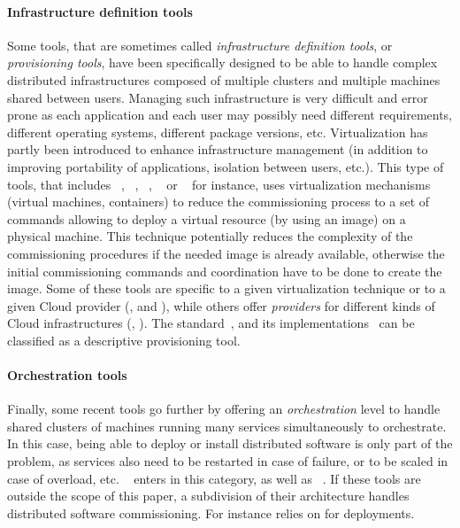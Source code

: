 \paragraph{Infrastructure definition tools}
Some tools, that are sometimes called \emph{infrastructure definition tools}, or \emph{provisioning tools}, have been specifically designed to be able to handle complex distributed infrastructures composed of multiple clusters and multiple machines shared between users. Managing such infrastructure is very difficult and error prone as each application and each user may possibly need different requirements, different operating systems, different package versions, etc. Virtualization has partly been introduced to enhance infrastructure management (in addition to improving portability of applications, isolation between users, etc.). This type of tools, that includes \docker~\cite{docker:web}, \terraform~\cite{terraform:web}, \juju~\cite{juju:web}, \cloudformation~\cite{cloudf:web} or \heat~\cite{heat:web} for instance, uses virtualization mechanisms (\eg virtual machines, containers) to reduce the commissioning process to a set of commands allowing to deploy a virtual resource (by using an image) on a physical machine. This technique potentially reduces the complexity of the commissioning procedures if the needed image is already available, otherwise the initial commissioning commands and coordination have to
be done to create the image. Some of these tools are specific to a given virtualization technique or to a given Cloud provider (\eg \docker, \cloudformation and \heat), while others offer \emph{providers} for different kinds of Cloud infrastructures (\eg \terraform, \juju). The \tosca standard~\cite{tosca:web}, and its
implementations~\cite{Binz2013,cloudify:web,opentosca:web,8599581} can be classified as a descriptive provisioning tool.

\paragraph{Orchestration tools}
Finally, some recent tools go further by offering an \emph{orchestration} level to handle shared clusters of machines running many services simultaneously to orchestrate. In this case, being able to deploy or install distributed software is only part of the problem, as services also need to be restarted in case of failure, or to be scaled in case of overload, etc. \kubernetes~\cite{kubernetes:web} enters in this category, as well as \dockerswarm~\cite{dockerswarm:web}. If these tools are outside the scope of this paper, a subdivision of their architecture handles distributed software commissioning. For instance \kubernetes relies on \docker for deployments. 

